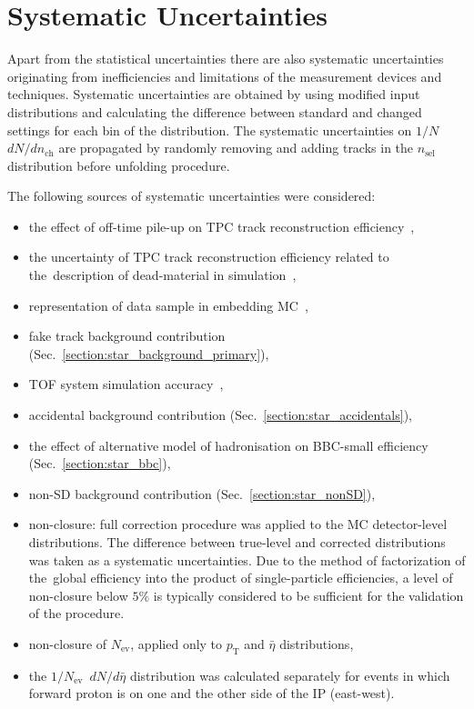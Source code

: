 \chapter{Systematic Uncertainties}\label{section:star_systematics}
Apart from the statistical uncertainties there are also systematic uncertainties originating from inefficiencies and limitations of the measurement devices and techniques. 
Systematic uncertainties are obtained by using modified input distributions and calculating the difference between standard and changed settings for each bin of the distribution. The systematic uncertainties on $1/N$~$dN/dn_\textrm{ch}$ are propagated by randomly removing and adding tracks in the $n_\textrm{sel}$ distribution before  unfolding procedure.

The following sources of systematic uncertainties were considered:
\begin{itemize}
	\item the effect of off-time pile-up on TPC track reconstruction efficiency~\cite{supplementaryNote},
	\item the uncertainty of TPC track reconstruction efficiency related to the~description of dead-material in simulation~\cite{supplementaryNote},
	\item representation of data sample in embedding MC~\cite{supplementaryNote},
	\item fake track background contribution (Sec.~\ref{section:star_background_primary}),
	\item TOF system simulation accuracy~\cite{supplementaryNote},
	\item accidental background contribution (Sec.~\ref{section:star_accidentals}),
	\item the effect of alternative model of hadronisation on BBC-small efficiency (Sec.~\ref{section:star_bbc}),
	\item non-SD background contribution (Sec.~\ref{section:star_nonSD}),
	\item non-closure: full correction procedure was applied to the MC detector-level distributions. The difference between true-level and corrected distributions was taken as a systematic uncertainties. Due to the method of factorization of the~global efficiency into the product of single-particle efficiencies, a level of non-closure below $5\%$ is typically considered to be sufficient for the validation of the procedure.
	\item non-closure of $N_\textrm{ev}$, applied only to $p_\textrm{T}$ and $\bar{\eta}$ distributions,
	\item the $1/N_\textrm{ev}$~$dN/d\bar{\eta}$ distribution was calculated separately for events in which forward proton is on one and the other side of the IP (east-west).
\end{itemize}



